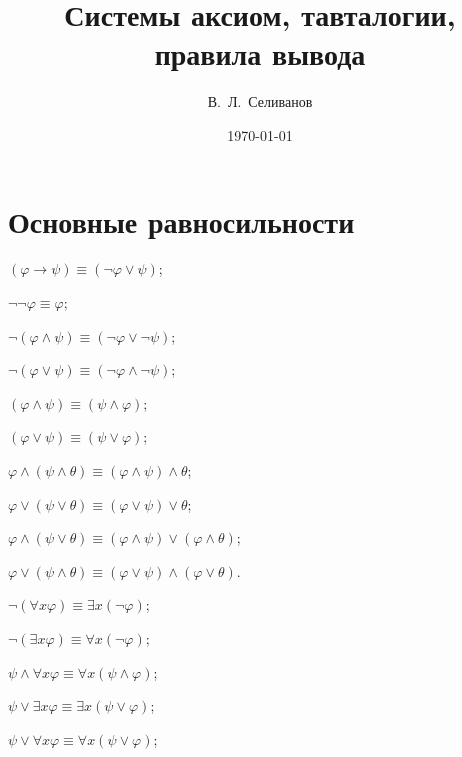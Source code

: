 \documentclass[a4paper,11pt]{article}
\title{Системы аксиом, тавталогии, правила вывода}
\date{\today}
\author{В.~Л.~Селиванов}
\begin{document}
 \maketitle

\section{Основные равносильности}

\item $(\varphi\rightarrow\psi)\equiv(\neg\varphi\lor\psi)$; 

\item $\neg\neg\varphi\equiv
\varphi$;

\item $\neg (\varphi \land \psi)\equiv (\neg\varphi\lor \neg\psi)$;

\item $\neg(\varphi \lor \psi) \equiv(\neg\varphi \land \neg\psi)$;

\item $(\varphi\land\psi) \equiv(\psi \land \varphi)$; 

\item $(\varphi
\lor \psi)
\equiv(\psi \lor \varphi)$;

\item $\varphi\land(\psi\land\theta)\equiv(\varphi\land\psi)\land\theta$;

\item $\varphi\lor (\psi\lor \theta) \equiv(\varphi \lor \psi) \lor \theta$;

\item $\varphi\land(\psi\lor\theta)\equiv(\varphi\land\psi)\lor(\varphi\land
\theta)$; 

\item $\varphi\lor(\psi\land\theta)\equiv(\varphi\lor\psi)\land(\varphi
\lor\theta)$.
\vspace{10mm}

\item $\neg(\forall x \varphi)\equiv \exists x (\neg\varphi)$; 

\item $\neg (\exists x \varphi)\equiv \forall x
(\neg\varphi)$;

\item $\psi \land \forall x \varphi\equiv \forall x (\psi\land
\varphi)$; 

\item $\psi\lor \exists x \varphi \equiv
\exists x (\psi \lor \varphi)$;

\item $\psi \lor \forall x \varphi\equiv \forall x (\psi\lor
\varphi)$; 
\end{document}
